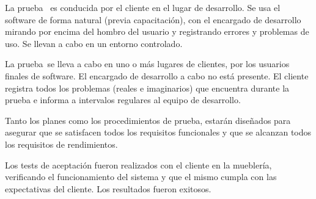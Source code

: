 La prueba \textalpha \, es conducida por el cliente en el lugar de desarrollo. Se usa el software de forma natural (previa capacitación), con el encargado de desarrollo mirando por encima del hombro del usuario y registrando errores y problemas de uso. Se llevan a cabo en un entorno controlado.

La prueba \textbeta \,se lleva a cabo en uno o más lugares de clientes, por los usuarios finales de software. El encargado de desarrollo a cabo no está presente. El cliente registra todos los problemas (reales e imaginarios) que encuentra durante la prueba e informa a intervalos regulares al equipo de desarrollo.

Tanto los planes como los procedimientos de prueba, estarán diseñados para asegurar que se satisfacen todos los requisitos funcionales y que se alcanzan todos los requisitos de rendimientos.

Los tests de aceptación fueron realizados con el cliente en la mueblería, verificando el funcionamiento del sistema y que el mismo cumpla con las expectativas del cliente. Los resultados fueron exitosos.
